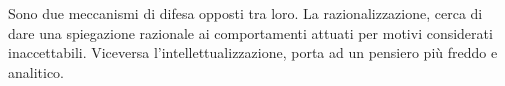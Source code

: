 \documentclass{subfiles}
\begin{document}
Sono due meccanismi di difesa opposti tra loro.
La razionalizzazione, cerca di dare una spiegazione razionale ai comportamenti attuati per motivi considerati inaccettabili.
Viceversa l'intellettualizzazione, porta ad un pensiero più freddo e analitico.
\end{document}
